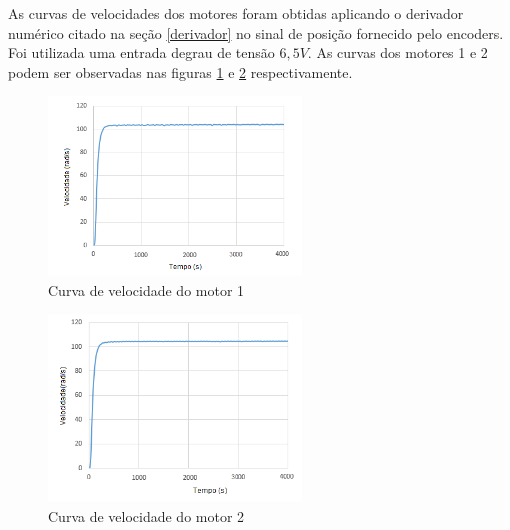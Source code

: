 \documentclass[]{politex}
\begin{document}
As curvas de velocidades dos motores foram obtidas aplicando o derivador numérico citado na seção \ref{derivador} no sinal de posição fornecido pelo encoders. Foi utilizada uma entrada degrau de tensão $6{,}5V$. As curvas dos motores 1 e 2 podem ser observadas nas figuras \ref{CM2} e \ref{CM3} respectivamente.
 \begin{figure}[H]
     \centering
     \includegraphics[width=0.6\textwidth]{imagens/velMotor1.png}
     \caption{Curva de velocidade do motor 1}
     \label{CM2}
 \end{figure}
 \begin{figure}[H]
     \centering
     \includegraphics[width=0.6\textwidth]{imagens/velMotor2.png}
     \caption{Curva de velocidade do motor 2}
     \label{CM3}
 \end{figure}
\end{document}
